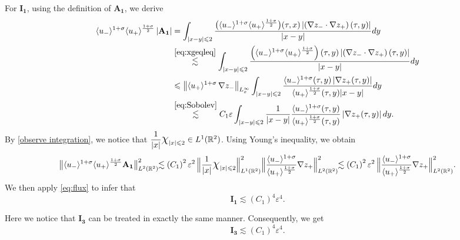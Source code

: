 \documentclass[10pt,reqno]{amsart}
\numberwithin{equation}{section}
\begin{document}
\begin{appendix}
For $\mathbf{I_1}$, using the definition of $\mathbf{A_1}$, we derive
\begin{align*}
	\langle u_-\rangle^{1+\sigma}\langle u_+\rangle^{\frac{{1+\sigma}}{2}}\left|\mathbf{A_1}\right|
	&=
	\int_{|x-y|\leqslant 2}\frac{\big(\langle u_-\rangle^{1+\sigma}\langle u_+\rangle^{\frac{{1+\sigma}}{2}}\big)(\tau,x)\left|\left(\nabla z_{-}\cdot\nabla z_{+}\right)(\tau,y)\right|}{|x-y|}dy\\
	&\stackrel{\eqref{eq:xgeqleq}}{\lesssim}
	\int_{|x-y|\leqslant 2}\frac{\left(\langle u_-\rangle^{1+\sigma}\langle u_+\rangle^{\frac{{1+\sigma}}{2}}\right)(\tau,y)\left|\left(\nabla z_{-}\cdot\nabla z_{+}\right)(\tau,y)\right|}{|x-y|}dy\\
	&\leqslant \left\|\langle u_{+}\rangle^{{1+\sigma}}\,\nabla z_-\right\|_{L^\infty_x}\int_{|x-y|\leqslant 2}\frac{\langle u_{-}\rangle^{{{1+\sigma}}}(\tau,y)\left|\nabla z_+(\tau,y)\right|}{\langle u_{+}\rangle^{\frac{{1+\sigma}}{2}}(\tau,y)|x-y|}dy\\
	&\stackrel{\eqref{eq:Sobolev}}{\lesssim}
	C_1\varepsilon\int_{|x-y|\leqslant 2}\frac{1}{|x-y|}\frac{\langle u_{-}\rangle^{{1+\sigma}}(\tau,y)}{\langle u_{+}\rangle^{\frac{{1+\sigma}}{2}}(\tau,y)} \left|\nabla z_+(\tau,y)\right|dy.
\end{align*}
By \eqref{observe integration},  we notice that $\dfrac{1}{|x|}\text{\Large$\text{\Large$\chi$}$}_{|x|\leqslant 2}\in L^1(\mathbb{R}^2)$. Using Young's inequality, we obtain
\begin{equation*}
	\big\|\langle u_-\rangle^{1+\sigma}\langle u_+\rangle^{\frac{{1+\sigma}}{2}}\mathbf{A_1}\big\|^2_{L^2(\mathbb{R}^2)}\!\!
	\lesssim\left(C_1\right)^2\varepsilon^2\,\Big\|\frac{1}{|x|}\text{\Large$\text{\Large$\chi$}$}_{|x|\leqslant 2}\Big\|^2_{L^1(\mathbb{R}^2)} \Big\|\frac{\langle u_{-}\rangle^{{1+\sigma}}}{\langle u_{+}\rangle^{\frac{{1+\sigma}}{2}}}\nabla z_{+}\Big\|^2_{L^2(\mathbb{R}^2)}\!\!
	\lesssim\left(C_1\right)^2\varepsilon^2\,\Big\|\frac{\langle u_{-}\rangle^{{1+\sigma}}}{\langle u_{+}\rangle^{\frac{{1+\sigma}}{2}}}\nabla z_{+}\Big\|^2_{L^2(\mathbb{R}^2)}.
\end{equation*}
We then apply \eqref{eq:flux} to infer that 
\begin{equation}\label{eq:I1 2d}
	\mathbf{I_{1}} \lesssim \left(C_1\right)^4\varepsilon^4.
\end{equation}

Here we notice that $\mathbf{I_3}$ can be treated in exactly the same manner. Consequently, we get 
\begin{equation}\label{eq:I3 2d}
	\mathbf{I_3}\lesssim \left(C_1\right)^4\varepsilon^4.
\end{equation}


\end{appendix}
\end{document}
